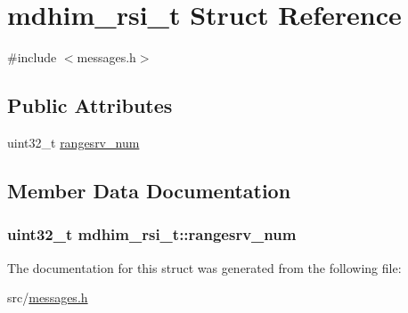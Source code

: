 \hypertarget{structmdhim__rsi__t}{\section{mdhim\-\_\-rsi\-\_\-t Struct Reference}
\label{structmdhim__rsi__t}
}


{\ttfamily \#include $<$messages.\-h$>$}

\subsection*{Public Attributes}
\begin{DoxyCompactItemize}
\item 
uint32\-\_\-t \hyperlink{structmdhim__rsi__t_accbcc2a99c8184df0649f04c01f60baf}{rangesrv\-\_\-num}
\end{DoxyCompactItemize}


\subsection{Member Data Documentation}
\hypertarget{structmdhim__rsi__t_accbcc2a99c8184df0649f04c01f60baf}{
\subsubsection[{rangesrv\-\_\-num}]{\setlength{\rightskip}{0pt plus 5cm}uint32\-\_\-t mdhim\-\_\-rsi\-\_\-t\-::rangesrv\-\_\-num}}\label{structmdhim__rsi__t_accbcc2a99c8184df0649f04c01f60baf}


The documentation for this struct was generated from the following file\-:\begin{DoxyCompactItemize}
\item 
src/\hyperlink{messages_8h}{messages.\-h}\end{DoxyCompactItemize}
